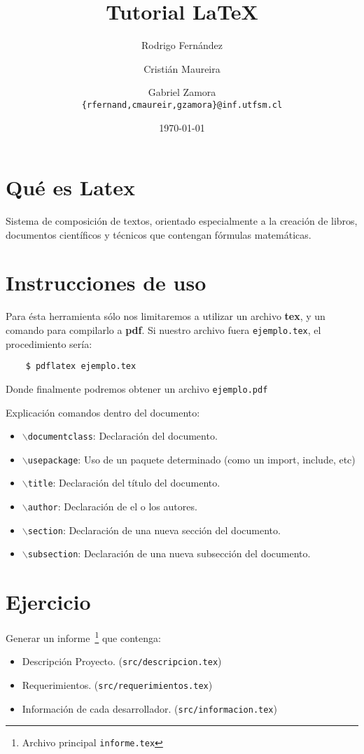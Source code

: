 \documentclass[letter, 10pt]{article}
\begin{document}
\title{Tutorial \LaTeX}
\author{Rodrigo Fernández \and Cristián Maureira \and Gabriel Zamora\\ \small{\texttt{\{rfernand,cmaureir,gzamora\}@inf.utfsm.cl}}}
\date{\today}

\maketitle

\section{Qué es Latex}
Sistema de composición de textos, orientado especialmente a la
creación de libros, documentos científicos y técnicos que contengan
fórmulas matemáticas.

\section{Instrucciones de uso}

Para ésta herramienta sólo nos limitaremos a utilizar un archivo \textbf{tex},
y un comando para compilarlo a \textbf{pdf}.
Si nuestro archivo fuera \texttt{ejemplo.tex}, el procedimiento sería:
\begin{verbatim}
	$ pdflatex ejemplo.tex
\end{verbatim}
Donde finalmente podremos obtener un archivo \texttt{ejemplo.pdf}

Explicación comandos dentro del documento:
\begin{itemize}
	\item \texttt{$\backslash$documentclass}: Declaración del documento.
	\item \texttt{$\backslash$usepackage}: Uso de un paquete determinado (como un import, include, etc)
	\item \texttt{$\backslash$title}: Declaración del título del documento.
	\item \texttt{$\backslash$author}: Declaración de el o los autores.
	\item \texttt{$\backslash$section}: Declaración de una nueva sección del documento.
	\item \texttt{$\backslash$subsection}: Declaración de una nueva subsección del documento.
\end{itemize}

\section{Ejercicio}
Generar un informe~\footnote{Archivo principal \texttt{informe.tex}} que contenga:

\begin{itemize}
	\item Descripción Proyecto. (\texttt{src/descripcion.tex})
	\item Requerimientos. (\texttt{src/requerimientos.tex})
	\item Información de cada desarrollador. (\texttt{src/informacion.tex})
\end{itemize}
\end{document}
